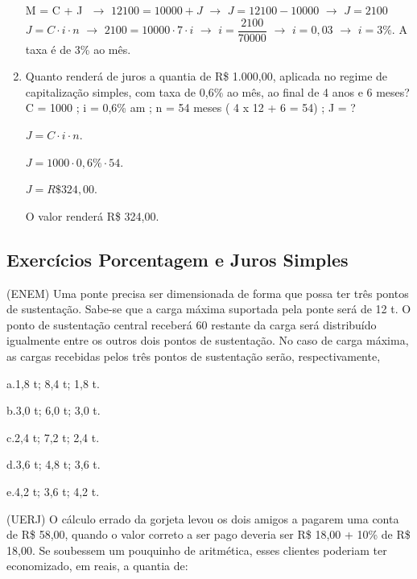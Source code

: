 \begin{multicols*}{2}
\begin{enumerate}
		      M = C + J $\, \, \rightarrow \, \, 12100 = 10000 + J \, \, \rightarrow \, \, J = 12100 - 10000 \, \, \rightarrow \, \, J = 2100$\\

		      $ J = C \cdot i \cdot n \, \, \rightarrow \, \,2100 = 10000 \cdot 7 \cdot i \, \, \rightarrow \, \, i = \dfrac{2100}{70000} \, \, \rightarrow \, \, i = 0,03 \, \, \rightarrow \, \, i = 3\% $. A taxa é de 3\% ao mês.

		\item Quanto renderá de juros a quantia de R\$ 1.000,00, aplicada no regime de capitalização simples, com taxa de 0,6\% ao mês, ao final de 4 anos e 6 meses? C = 1000 ; i = 0,6\% am ; n = 54 meses ( 4 x 12 + 6 = 54) ; J = ?

		      $ J = C \cdot i \cdot n$.

		      $ J = 1000 \cdot 0,6\% \cdot 54 $.

		      $ J = R\$ 324,00 $.

		      O valor renderá R\$ 324,00.

	\end{enumerate}

	\subsection{Exercícios Porcentagem e Juros Simples}

		\setcounter{numexercicio}{0}
		\execnum (ENEM) Uma ponte precisa ser dimensionada de forma que possa ter três pontos de sustentação. Sabe-se que a carga máxima suportada pela ponte será de 12 t. O ponto de sustentação central receberá 60%
		      restante da carga será distribuído igualmente entre os outros dois pontos de sustentação. No caso de carga máxima, as cargas recebidas pelos três pontos de sustentação serão, respectivamente,

		      a.1,8 t; 8,4 t; 1,8 t.

		      b.3,0 t; 6,0 t; 3,0 t.

		      c.2,4 t; 7,2 t; 2,4 t.

		      d.3,6 t; 4,8 t; 3,6 t.

		      e.4,2 t; 3,6 t; 4,2 t.

		\execnum (UERJ) O cálculo errado da gorjeta levou os dois amigos a pagarem uma conta de R\$ 58,00, quando o valor correto a ser pago deveria ser R\$ 18,00 + 10\% de R\$ 18,00. Se soubessem um pouquinho de aritmética, esses clientes
		      poderiam ter economizado, em reais, a quantia de:


\end{multicols*}
